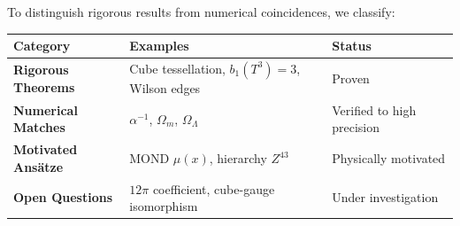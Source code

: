 \documentclass[11pt,a4paper]{article}
\theoremstyle{plain}
\theoremstyle{definition}
\theoremstyle{remark}
\begin{document}
To distinguish rigorous results from numerical coincidences, we classify:

\begin{table}[h!]
\centering
\begin{tabular}{lll}
\toprule
\textbf{Category} & \textbf{Examples} & \textbf{Status} \\
\midrule
\textbf{Rigorous Theorems} & Cube tessellation, $b_1(T^3)=3$, Wilson edges & Proven \\
\textbf{Numerical Matches} & $\alpha^{-1}$, $\Omega_m$, $\Omega_\Lambda$ & Verified to high precision \\
\textbf{Motivated Ans\"atze} & MOND $\mu(x)$, hierarchy $Z^{43}$ & Physically motivated \\
\textbf{Open Questions} & $12\pi$ coefficient, cube-gauge isomorphism & Under investigation \\
\bottomrule
\end{tabular}
\end{table}
\end{document}
